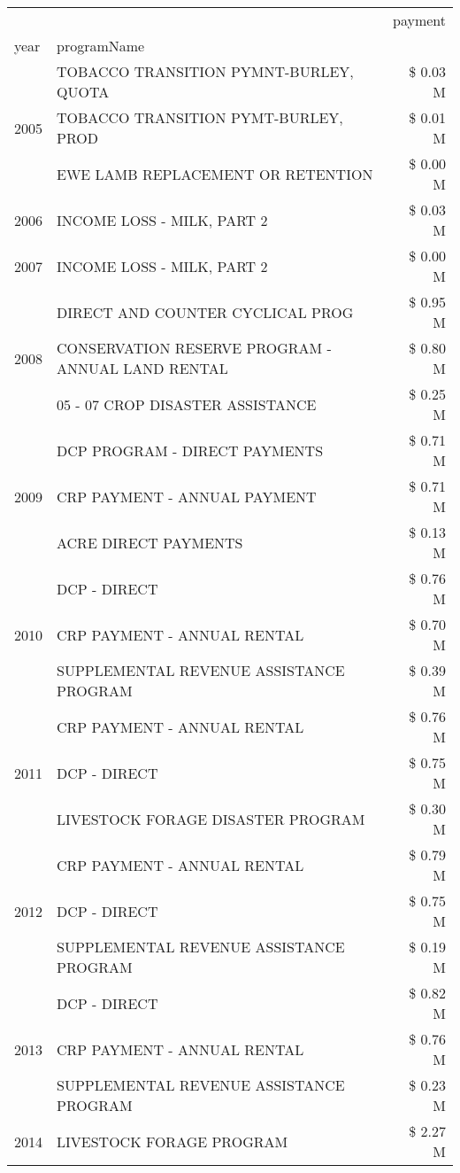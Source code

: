 \begin{tabular}{llr}
\toprule
 &  & payment \\
year & programName &  \\
\midrule
\multirow[t]{3}{*}{2005} & TOBACCO TRANSITION PYMNT-BURLEY, QUOTA & \$ 0.03 M \\
 & TOBACCO TRANSITION PYMT-BURLEY, PROD & \$ 0.01 M \\
 & EWE LAMB REPLACEMENT OR RETENTION & \$ 0.00 M \\
\cline{1-3}
2006 & INCOME LOSS - MILK, PART 2 & \$ 0.03 M \\
\cline{1-3}
2007 & INCOME LOSS - MILK, PART 2 & \$ 0.00 M \\
\cline{1-3}
\multirow[t]{3}{*}{2008} & DIRECT AND COUNTER CYCLICAL PROG & \$ 0.95 M \\
 & CONSERVATION RESERVE PROGRAM - ANNUAL LAND RENTAL & \$ 0.80 M \\
 & 05 - 07 CROP DISASTER ASSISTANCE & \$ 0.25 M \\
\cline{1-3}
\multirow[t]{3}{*}{2009} & DCP PROGRAM - DIRECT PAYMENTS & \$ 0.71 M \\
 & CRP PAYMENT - ANNUAL PAYMENT & \$ 0.71 M \\
 & ACRE DIRECT PAYMENTS & \$ 0.13 M \\
\cline{1-3}
\multirow[t]{3}{*}{2010} & DCP - DIRECT & \$ 0.76 M \\
 & CRP PAYMENT - ANNUAL RENTAL & \$ 0.70 M \\
 & SUPPLEMENTAL REVENUE ASSISTANCE PROGRAM & \$ 0.39 M \\
\cline{1-3}
\multirow[t]{3}{*}{2011} & CRP PAYMENT - ANNUAL RENTAL & \$ 0.76 M \\
 & DCP - DIRECT & \$ 0.75 M \\
 & LIVESTOCK FORAGE DISASTER PROGRAM & \$ 0.30 M \\
\cline{1-3}
\multirow[t]{3}{*}{2012} & CRP PAYMENT - ANNUAL RENTAL & \$ 0.79 M \\
 & DCP - DIRECT & \$ 0.75 M \\
 & SUPPLEMENTAL REVENUE ASSISTANCE PROGRAM & \$ 0.19 M \\
\cline{1-3}
\multirow[t]{3}{*}{2013} & DCP - DIRECT & \$ 0.82 M \\
 & CRP PAYMENT - ANNUAL RENTAL & \$ 0.76 M \\
 & SUPPLEMENTAL REVENUE ASSISTANCE PROGRAM & \$ 0.23 M \\
\cline{1-3}
\multirow[t]{3}{*}{2014} & LIVESTOCK FORAGE PROGRAM & \$ 2.27 M \\

\end{tabular}
